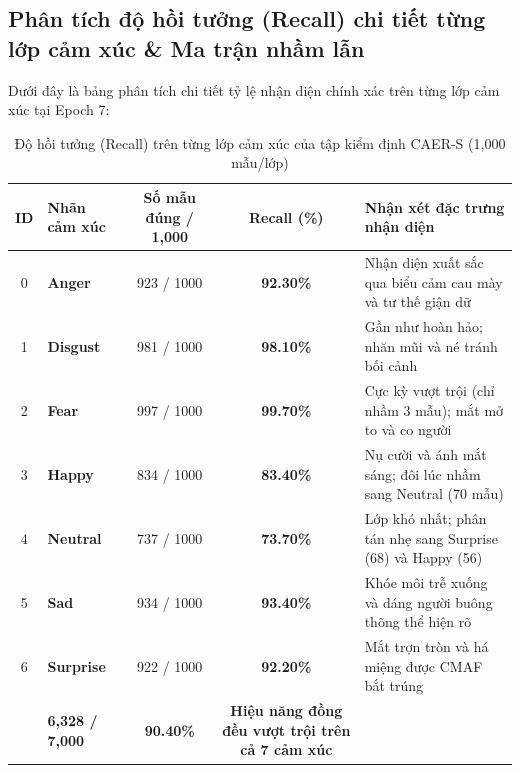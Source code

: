 \documentclass[10pt,a4paper]{article}
\begin{document}
\subsection{Phân tích độ hồi tưởng (Recall) chi tiết từng lớp cảm xúc \& Ma trận nhầm lẫn}

\noindent Dưới đây là bảng phân tích chi tiết tỷ lệ nhận diện chính xác trên từng lớp cảm xúc tại Epoch 7:

\begin{table}[H]
\centering
\small
\caption{Độ hồi tưởng (Recall) trên từng lớp cảm xúc của tập kiểm định CAER-S (1,000 mẫu/lớp)}
\label{tab:caers_per_class}
\begin{tabularx}{\textwidth}{c l c c X}
\toprule
\rowcolor{tableheader}
\textbf{ID} & \textbf{Nhãn cảm xúc} & \textbf{Số mẫu đúng / 1,000} & \textbf{Recall (\%)} & \textbf{Nhận xét đặc trưng nhận diện} \\
\midrule
0 & \textbf{Anger} & 923 / 1000 & \textbf{92.30\%} & Nhận diện xuất sắc qua biểu cảm cau mày và tư thế giận dữ \\
1 & \textbf{Disgust} & 981 / 1000 & \textbf{98.10\%} & Gần như hoàn hảo; nhăn mũi và né tránh bối cảnh \\
2 & \textbf{Fear} & 997 / 1000 & \textbf{99.70\%} & Cực kỳ vượt trội (chỉ nhầm 3 mẫu); mắt mở to và co người \\
3 & \textbf{Happy} & 834 / 1000 & \textbf{83.40\%} & Nụ cười và ánh mắt sáng; đôi lúc nhầm sang Neutral (70 mẫu) \\
4 & \textbf{Neutral} & 737 / 1000 & \textbf{73.70\%} & Lớp khó nhất; phân tán nhẹ sang Surprise (68) và Happy (56) \\
5 & \textbf{Sad} & 934 / 1000 & \textbf{93.40\%} & Khóe môi trễ xuống và dáng người buông thõng thể hiện rõ \\
6 & \textbf{Surprise} & 922 / 1000 & \textbf{92.20\%} & Mắt trợn tròn và há miệng được CMAF bắt trúng \\
\midrule
\rowcolor{grouprow}
\multicolumn{2}{l}{\textbf{Trung bình toàn bộ (WAR / UAR)}} & \textbf{6,328 / 7,000} & \textbf{90.40\%} & \textbf{Hiệu năng đồng đều vượt trội trên cả 7 cảm xúc} \\
\bottomrule
\end{tabularx}
\end{table}
\end{document}
